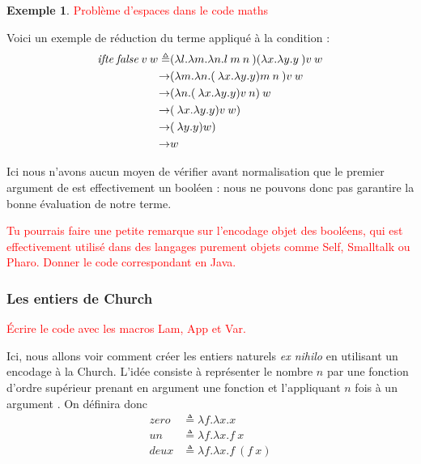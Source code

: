 \documentclass {article}
\theoremstyle{definition}
\newtheorem{example}{Exemple}
\theoremstyle{remark}
\newcommand{\todo}[1]{\textcolor{red}{#1}}
\begin{document}
\begin{example}
  \todo{Problème d'espaces dans le code maths}

  Voici un exemple de réduction du terme \Ifte{} appliqué à la condition \False{} :
  \begin{align*}
    \mathit{ifte}\:\mathit{false}\:v\:w  \triangleq& (\lambda l. \lambda m. \lambda n. l\:m\:n\:)({\lambda x. \lambda y. y}\:){v}\:w \\
    \rightarrow & ({\lambda m. \lambda n. (\:\lambda x. \lambda y. y){m}\:n}\:){v}\:w \\
    \rightarrow & (\lambda n. (\:\lambda x. \lambda y. y){v}\:n)\:w \\
    \rightarrow & (\:\lambda x. \lambda y. y){v}\:w) \\
    \rightarrow & (\:\lambda y. y){w}) \\
    \rightarrow & w
  \end{align*}
\end{example}

Ici nous n'avons aucun moyen de vérifier avant normalisation que le
premier argument de \Ifte{} est effectivement un booléen : nous ne
pouvons donc pas garantire la bonne évaluation de notre terme.

\todo{Tu pourrais faire une petite remarque sur l'encodage objet des
  booléens, qui est effectivement utilisé dans des langages purement
  objets comme Self, Smalltalk ou Pharo. Donner le code correspondant en Java.} 

\subsubsection{Les entiers de Church}

\newcommand{\Zero}{\mathit{zero}}
\newcommand{\Un}{\mathit{un}}
\newcommand{\Deux}{\mathit{deux}}
\newcommand{\Succ}{\mathit{successeur}}
\newcommand{\Plus}{\mathit{plus}}

\todo{Écrire le code avec les macros Lam, App et Var.}

Ici, nous allons voir comment créer les entiers naturels \textit{ex
  nihilo} en utilisant un encodage à la Church. L'idée consiste à
représenter le nombre \(n\) par une fonction d'ordre supérieur prenant
en argument une fonction  et l'appliquant \(n\) fois à un
argument . On définira donc
%
\begin{align*}
\Zero &\triangleq \lambda f. \lambda x. x \\
\Un   &\triangleq \lambda f. \lambda x. f\: x \\
\Deux &\triangleq \lambda f. \lambda x. f\: (f\: x)
\end{align*}
\end{document}

